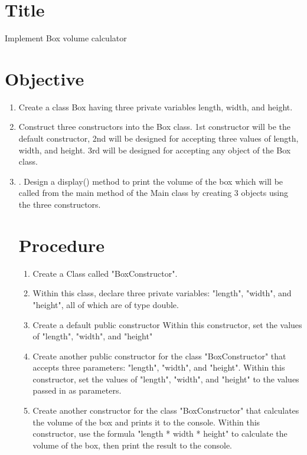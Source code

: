 \documentclass{report}
\begin{document}
\clearpage


\section{Title}
\Large Implement Box volume calculator

\section{Objective }
\begin{enumerate}
\item  Create a class Box having three private variables length, width, and height. \\
\item  Construct three constructors into the Box class. 1st constructor will be the default constructor, 2nd will be designed for accepting three values of length, width, and height. 3rd will be designed for accepting any object of the Box class.   \\
\item . Design a display() method to print the volume of the box which will be called from the main method of the Main class by creating 3 objects using the three constructors.

\section{Procedure}
\begin{enumerate}
\item  Create a Class called "BoxConstructor".

\item  Within this class, declare three private 
variables: "length", "width", and "height",
 all of which are of type double.

\item Create a default public constructor  Within this constructor,
 set the values of "length", "width", and "height"


\item Create another public constructor for the class "BoxConstructor" that accepts three parameters:
 "length", "width", and "height". Within this constructor, set the values of "length", "width", and "height" to the values passed in as parameters.

\item Create another constructor for the class "BoxConstructor" that calculates the volume 
of the box and prints it to the console. Within this constructor, use the 
formula "length * width * height" to calculate the volume of the box, then print the result to the console.


\end{enumerate}
\end{enumerate}
\end{document}
